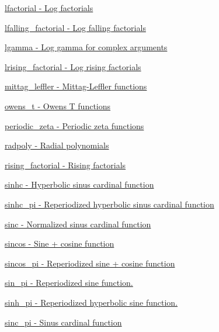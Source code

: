 \begin{DoxyItemize}
\item \hyperlink{group__mathsf__gnu_gab256f8d7b77b9a8fefafca21827166eb}{lfactorial -\/ Log factorials}
\item \hyperlink{group__mathsf__gnu_ga2032c10640d5010666d60d9faec86c32}{lfalling\+\_\+factorial -\/ Log falling factorials}
\item \hyperlink{group__mathsf__gnu_ga40fa5127f7c419ed1d8f1c6a6f96ea9b}{lgamma -\/ Log gamma for complex arguments}
\item \hyperlink{group__mathsf__gnu_ga8912b75b2f7592fb61128c766e7313b9}{lrising\+\_\+factorial -\/ Log rising factorials}
\item \hyperlink{group__mathsf__gnu_ga1a51079e00fbe5473d8cf9ad3304c5c6}{mittag\+\_\+leffler -\/ Mittag-\/\+Leffler functions}
\item \hyperlink{group__mathsf__gnu_gab4e367aae19853cca3af99eead01fcaa}{owens\+\_\+t -\/ Owens T functions}
\item \hyperlink{group__mathsf__gnu_ga06b06216e87b868cb21c76d33ac560c8}{periodic\+\_\+zeta -\/ Periodic zeta functions}
\item \hyperlink{group__mathsf__gnu_ga195db2592888b7a8df870d9eaeff8d05}{radpoly -\/ Radial polynomials}
\item \hyperlink{group__mathsf__gnu_gae8c36a0e1f60254cf212a3806f7c675c}{rising\+\_\+factorial -\/ Rising factorials}
\item \hyperlink{group__mathsf__gnu_gaf2f02e4143e7beb97352cef4b7fcb663}{sinhc -\/ Hyperbolic sinus cardinal function}
\item \hyperlink{group__mathsf__gnu_ga8bb6034e28d48879845bf64818cc06e1}{sinhc\+\_\+pi -\/ Reperiodized hyperbolic sinus cardinal function}
\item \hyperlink{group__mathsf__gnu_ga09976b5d041113979c93613cc3700348}{sinc -\/ Normalized sinus cardinal function}
\item \hyperlink{group__mathsf__gnu_ga8041c24b528475bcf8a4178e484652a3}{sincos -\/ Sine + cosine function}
\item \hyperlink{group__mathsf__gnu_ga6553883f127ea0de67041c3128e03813}{sincos\+\_\+pi -\/ Reperiodized sine + cosine function}
\item \hyperlink{group__mathsf__gnu_ga220f8a9a0477697cff96e84dc911d5f0}{sin\+\_\+pi -\/ Reperiodized sine function.}
\item \hyperlink{group__mathsf__gnu_gade43453b87b6b38c05b3fcce40870542}{sinh\+\_\+pi -\/ Reperiodized hyperbolic sine function.}
\item \hyperlink{group__mathsf__gnu_ga5195270024403b985e7d4f2f935f8779}{sinc\+\_\+pi -\/ Sinus cardinal function}

\end{DoxyItemize}

